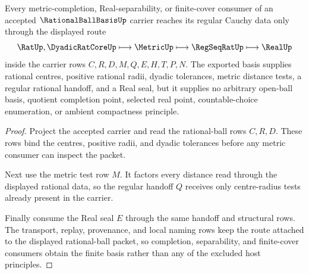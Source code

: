 \begin{theorem}
\label{thm:rational-ball-basis-regular-cauchy-handoff}
Every metric-completion, Real-separability, or finite-cover consumer of an accepted $\RationalBallBasisUp$ carrier reaches its regular Cauchy data only through the displayed route
$$
\RatUp,\DyadicRatCoreUp
\longmapsto
\MetricUp
\longmapsto
\RegSeqRatUp
\longmapsto
\RealUp
$$
inside the carrier rows $C,R,D,M,Q,E,H,T,P,N$. The exported basis supplies rational centres, positive rational radii, dyadic tolerances, metric distance tests, a regular rational handoff, and a Real seal, but it supplies no arbitrary open-ball basis, quotient completion point, selected real point, countable-choice enumeration, or ambient compactness principle.
\end{theorem}
\begin{proof}
Project the accepted carrier and read the rational-ball rows $C,R,D$. These rows bind the centres, positive radii, and dyadic tolerances before any metric consumer can inspect the packet.

Next use the metric test row $M$. It factors every distance read through the displayed rational data, so the regular handoff $Q$ receives only centre-radius tests already present in the carrier.

Finally consume the Real seal $E$ through the same handoff and structural rows. The transport, replay, provenance, and local naming rows keep the route attached to the displayed rational-ball packet, so completion, separability, and finite-cover consumers obtain the finite basis rather than any of the excluded host principles.
\end{proof}




